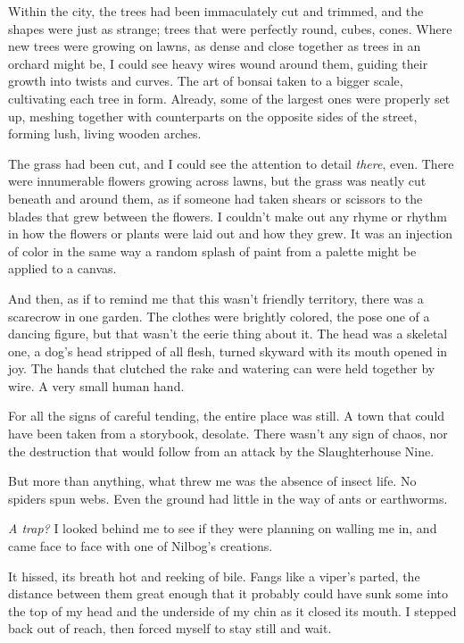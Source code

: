 Within the city, the trees had been immaculately cut and trimmed, and the shapes were just as strange; trees that were perfectly round, cubes, cones.  Where new trees were growing on lawns, as dense and close together as trees in an orchard might be, I could see heavy wires wound around them, guiding their growth into twists and curves.  The art of bonsai taken to a bigger scale, cultivating each tree in form.  Already, some of the largest ones were properly set up, meshing together with counterparts on the opposite sides of the street, forming lush, living wooden arches.



The grass had been cut, and I could see the attention to detail \emph{there}, even.  There were innumerable flowers growing across lawns, but the grass was neatly cut beneath and around them, as if someone had taken shears or scissors to the blades that grew between the flowers.  I couldn't make out any rhyme or rhythm in how the flowers or plants were laid out and how they grew.  It was an injection of color in the same way a random splash of paint from a palette might be applied to a canvas.



And then, as if to remind me that this wasn't friendly territory, there was a scarecrow in one garden.  The clothes were brightly colored, the pose one of a dancing figure, but that wasn't the eerie thing about it.  The head was a skeletal one, a dog's head stripped of all flesh, turned skyward with its mouth opened in joy.  The hands that clutched the rake and watering can were held together by wire.  A very small human hand.



For all the signs of careful tending, the entire place was still.  A town that could have been taken from a storybook, desolate.  There wasn't any sign of chaos, nor the destruction that would follow from an attack by the Slaughterhouse Nine.



But more than anything, what threw me was the absence of insect life.  No spiders spun webs.  Even the ground had little in the way of ants or earthworms.



\emph{A trap?}  I looked behind me to see if they were planning on walling me in, and came face to face with one of Nilbog's creations.



It hissed, its breath hot and reeking of bile.  Fangs like a viper's parted, the distance between them great enough that it probably could have sunk some into the top of my head and the underside of my chin as it closed its mouth.  I stepped back out of reach, then forced myself to stay still and wait.



